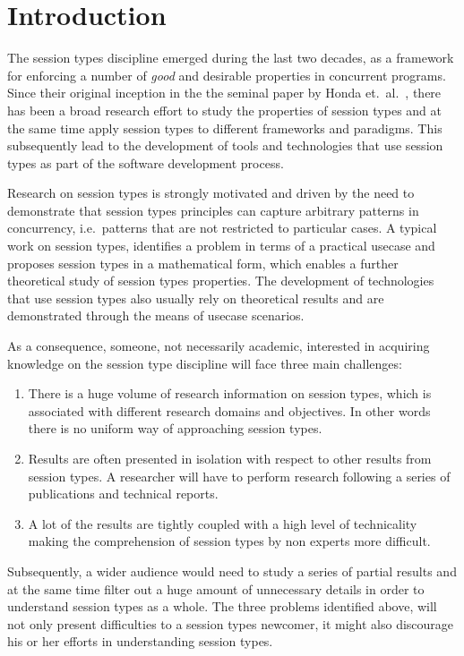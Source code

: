 \section{Introduction}

The session types discipline emerged during the last
two decades, as a framework for enforcing a number
of {\em good} and desirable properties in concurrent
programs.
Since their original inception in the the seminal paper by
Honda et.~al.~\cite{honda.vasconcelos.kubo:language-primitives},
there has been a broad research effort to study the properties of
session types and at the same time apply session types to different
frameworks and paradigms. This subsequently lead to the development
of tools and technologies that use session types as part of the 
software development process.

Research on session types is strongly motivated and driven by
the need to demonstrate that session types principles can
capture arbitrary patterns in concurrency,
i.e.~patterns that are not restricted to particular cases.
A typical work on session types, identifies a problem
in terms of a practical usecase and proposes session types
in a mathematical form, which enables a further
theoretical study of session types properties. The development
of technologies that use session types also usually rely on
theoretical results and are demonstrated through the means
of usecase scenarios.

As a consequence, someone, not necessarily academic,
interested in acquiring knowledge on the session type discipline
will face three main challenges:
%
\begin{enumerate}%
	\item	There is a huge volume of research information on
			session types, which is associated with different
			research domains and objectives. In other words
			there is no uniform way of approaching session types.

	\item	Results are often presented in isolation with
			respect to other results from session types.
			A researcher will have to perform research
			following a series of publications and
			technical reports.

	\item	A lot of the results are tightly coupled with
			a high level of technicality making the
			comprehension of session types by non experts
			more difficult.
\end{enumerate}
%
Subsequently, a wider audience would need to study a series
of partial results and at the same time filter out a huge
amount of unnecessary details in order to understand session types
as a whole.
The three problems identified above, will not only present
difficulties to a session types newcomer, it might also
discourage his or her efforts in understanding session types.

